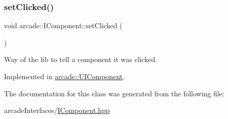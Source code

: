 \mbox{\label{classarcade_1_1_i_component_ae0cd9b58ad0b127c671a5d8f92d9c25f}} 
\subsubsection{\texorpdfstring{set\+Clicked()}{setClicked()}}
{\footnotesize\ttfamily void arcade\+::\+I\+Component\+::set\+Clicked (\begin{DoxyParamCaption}{ }\end{DoxyParamCaption})\hspace{0.3cm}{\ttfamily [pure virtual]}}



Way of the lib to tell a component it was clicked. 



Implemented in \hyperlink{classarcade_1_1_u_i_component_a8d87597d38fbc7cd93835d5712e3915c}{arcade\+::\+U\+I\+Component}.



The documentation for this class was generated from the following file\+:\begin{DoxyCompactItemize}
\item 
arcade\+Interfaces/\hyperlink{_i_component_8hpp}{I\+Component.\+hpp}\end{DoxyCompactItemize}
